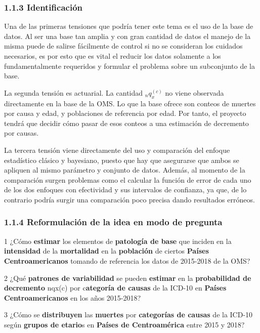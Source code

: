 \documentclass[
  letterpaper,
  DIV=11,
  numbers=noendperiod]{scrartcl}
\begin{document}
\subsubsection{1.1.3 Identificación}\label{identificaciuxf3n}

Una de las primeras tensiones que podría tener este tema es el uso de la
base de datos. Al ser una base tan amplia y con gran cantidad de datos
el manejo de la misma puede de salirse fácilmente de control si no se
consideran los cuidados necesarios, es por esto que es vital el reducir
los datos solamente a los fundamentalmente requeridos y formular el
problema sobre un subconjunto de la base.

La segunda tensión es actuarial. La cantidad \({}_{n}q_{x}^{(c)}\) no
viene observada directamente en la base de la OMS. Lo que la base ofrece
son conteos de muertes por causa y edad, y poblaciones de referencia por
edad. Por tanto, el proyecto tendrá que decidir cómo pasar de esos
conteos a una estimación de decremento por causas.

La tercera tensión viene directamente del uso y comparación del enfoque
estadístico clásico y bayesiano, puesto que hay que asegurarse que ambos
se apliquen al mismo parámetro y conjunto de datos. Además, al momento
de la comparación surgen problemas como el calcular la función de error
de cada uno de los dos enfoques con efectividad y sus intervalos de
confianza, ya que, de lo contrario podría surgir una comparación poco
precisa dando resultados erróneos.

\subsubsection{1.1.4 Reformulación de la idea en modo de
pregunta}\label{reformulaciuxf3n-de-la-idea-en-modo-de-pregunta}

1 ¿Cómo \textbf{estimar} los elementos de \textbf{patología de base} que
inciden en la \textbf{intensidad} de la \textbf{mortalidad} en la
\textbf{población} de ciertos \textbf{Países Centroamericanos} tomando
de referencia los datos de 2015-2018 de la OMS?~

2 ¿Qué \textbf{patrones de variabilidad} se pueden \textbf{estimar} en
la \textbf{probabilidad de decremento} nqx(c) por c\textbf{ategoría de
causas} de la ICD-10 en \textbf{Países Centroamericanos} en los años
2015-2018?

3 ¿Cómo se \textbf{distribuyen} las \textbf{muertes} por
\textbf{categorías de causas} de la ICD-10 según \textbf{grupos de
etario}s en \textbf{Países de Centroamérica} entre 2015 y 2018?
\end{document}
